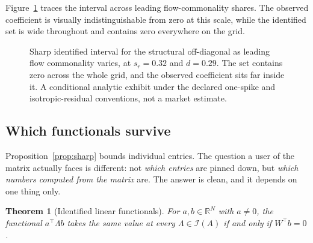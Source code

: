 \documentclass[10pt,twocolumn]{article}
\newtheorem{theorem}{Theorem}
\theoremstyle{remark}
\begin{document}
Figure~\ref{fig:bounds} traces the interval across leading flow-commonality
shares. The observed coefficient is visually indistinguishable from zero at
this scale, while the identified set is wide throughout and contains zero
everywhere on the grid.

\begin{figure}[t]
\centering
{}
\caption{Sharp identified interval for the structural off-diagonal as leading
flow commonality varies, at $s_r=0.32$ and $d=0.29$. The set contains zero
across the whole grid, and the observed coefficient sits far inside it. A
conditional analytic exhibit under the declared one-spike and
isotropic-residual conventions, not a market estimate.}
\label{fig:bounds}
\end{figure}

\subsection{Which functionals survive}
\label{sec:functionals}

Proposition~\ref{prop:sharp} bounds individual entries. The question a user of
the matrix actually faces is different: not \emph{which entries} are pinned
down, but \emph{which numbers computed from the matrix} are. The answer is
clean, and it depends on one thing only.

\begin{theorem}[Identified linear functionals]
\label{thm:linfun}
For $a,b\in\mathbb R^N$ with $a\ne0$, the functional $a^\top\Lambda b$ takes
the same value at every $\Lambda\in\mathcal I(A)$ if and only if
$W^\top b=0$.
\end{theorem}
\end{document}
